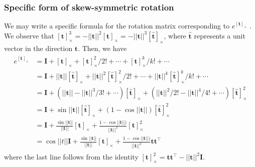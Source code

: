 \documentclass[12pt]{article}
\numberwithin{equation}{section}
\begin{document}
\subsubsection{Specific form of skew-symmetric rotation}
\label{sec:skew:small}

We may write a specific formula for the rotation matrix corresponding to $e^{[\mathbf{t}]_{\times}}$ . We observe that $[\mathbf{t}]_{\times}^3 = -||\mathbf{t}||^2[\mathbf{t}]_{\times} = -||\mathbf{t}||^3[\hat{\mathbf{t}}]_{\times} $, where $\hat{\mathbf{t}}$ represents a unit vector in the
direction $\mathbf{t}$. Then, we have
\begin{align}
\begin{split}
e^{[\mathbf{t}]_{\times}} &= \mathbf{I} + [\mathbf{t}]_{\times}+ [\mathbf{t}]_{\times}^2 / 2! + \cdots + [\mathbf{t}]_{\times}^k / k! + \cdots \\
&= \mathbf{I} +||\mathbf{t}|| [\hat{\mathbf{t}}]_{\times}+ ||\mathbf{t}||^2 [\hat{\mathbf{t}}]_{\times}^2 / 2! + \cdots + ||\mathbf{t}||^k [\hat{\mathbf{t}}]_{\times}^k / k! + \cdots \\
&=  \mathbf{I} + (||\mathbf{t}|| - ||\mathbf{t}||^3/3! + \cdots)[\hat{\mathbf{t}}]_{\times} + (||\mathbf{t}||^2/2! - ||\mathbf{t}||^4/4! + \cdots)[\hat{\mathbf{t}}]_{\times}^2\\
&= \mathbf{I} + \sin||\mathbf{t}||[\hat{\mathbf{t}}]_{\times} + (1-\cos||\mathbf{t}||)[\hat{\mathbf{t}}]_{\times}^2 \\
&= \mathbf{I} + \frac{\sin||\mathbf{t}||}{||\mathbf{t}||}[\mathbf{t}]_{\times} + \frac{1-\cos||\mathbf{t}||)}{||\mathbf{t}||^2}[\mathbf{t}]_{\times}^2 \\
& = \cos ||t|| \mathbf{I} + \frac{\sin||\mathbf{t}||}{||\mathbf{t}||}[\mathbf{t}]_{\times} + \frac{1-\cos||\mathbf{t}||)}{||\mathbf{t}||^2} \mathbf{tt^\top}
\end{split}
\label{eq:skew:rotfull}
\end{align}
where the last line follows from the identity $[\mathbf{t}]_{\times}^2 = \mathbf{tt^\top} - ||\mathbf{t}||^2\mathbf{I}$.
\end{document}
